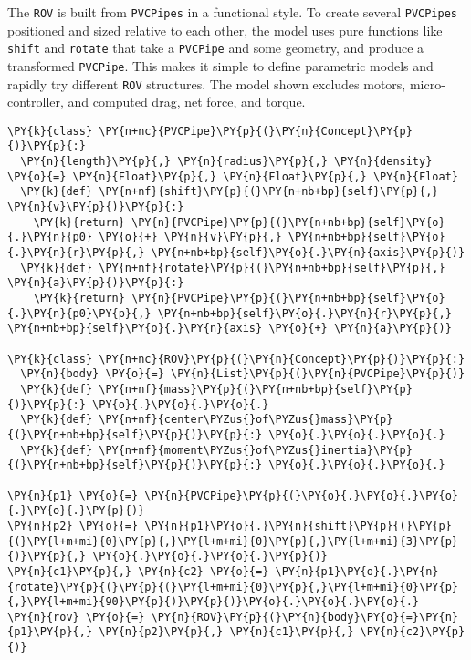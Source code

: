 \documentclass[letterpaper,compsoc,twoside]{IEEEtran}
\makeatletter
\def\PY@reset{\let\PY@it=\relax \let\PY@bf=\relax \let\PY@ul=\relax \let\PY@tc=\relax \let\PY@bc=\relax \let\PY@ff=\relax}
\def\PY@tok#1{\csname PY@tok@#1\endcsname}
\def\PY@toks#1+{\ifx\relax#1\empty\else \PY@tok{#1}\expandafter\PY@toks\fi}
\def\PY@do#1{\PY@bc{\PY@tc{\PY@ul{\PY@it{\PY@bf{\PY@ff{#1}}}}}}}
\def\PY#1#2{\PY@reset\PY@toks#1+\relax+\PY@do{#2}}
\def\PYZus{\char`\_}
\makeatother
\begin{document}
The \texttt{ROV} is built from \texttt{PVCPipes} in a functional style. To create several \texttt{PVCPipes} positioned and sized relative to each other, the model uses pure functions like \texttt{shift} and \texttt{rotate} that take a \texttt{PVCPipe} and some geometry, and produce a transformed \texttt{PVCPipe}. This makes it simple to define parametric models and rapidly try different \texttt{ROV} structures. The model shown excludes motors, micro-controller, and computed drag, net force, and torque.\begin{Verbatim}[commandchars=\\\{\},fontsize=\footnotesize]
\PY{k}{class} \PY{n+nc}{PVCPipe}\PY{p}{(}\PY{n}{Concept}\PY{p}{)}\PY{p}{:}
  \PY{n}{length}\PY{p}{,} \PY{n}{radius}\PY{p}{,} \PY{n}{density} \PY{o}{=} \PY{n}{Float}\PY{p}{,} \PY{n}{Float}\PY{p}{,} \PY{n}{Float}
  \PY{k}{def} \PY{n+nf}{shift}\PY{p}{(}\PY{n+nb+bp}{self}\PY{p}{,} \PY{n}{v}\PY{p}{)}\PY{p}{:}
    \PY{k}{return} \PY{n}{PVCPipe}\PY{p}{(}\PY{n+nb+bp}{self}\PY{o}{.}\PY{n}{p0} \PY{o}{+} \PY{n}{v}\PY{p}{,} \PY{n+nb+bp}{self}\PY{o}{.}\PY{n}{r}\PY{p}{,} \PY{n+nb+bp}{self}\PY{o}{.}\PY{n}{axis}\PY{p}{)}
  \PY{k}{def} \PY{n+nf}{rotate}\PY{p}{(}\PY{n+nb+bp}{self}\PY{p}{,} \PY{n}{a}\PY{p}{)}\PY{p}{:}
    \PY{k}{return} \PY{n}{PVCPipe}\PY{p}{(}\PY{n+nb+bp}{self}\PY{o}{.}\PY{n}{p0}\PY{p}{,} \PY{n+nb+bp}{self}\PY{o}{.}\PY{n}{r}\PY{p}{,} \PY{n+nb+bp}{self}\PY{o}{.}\PY{n}{axis} \PY{o}{+} \PY{n}{a}\PY{p}{)}

\PY{k}{class} \PY{n+nc}{ROV}\PY{p}{(}\PY{n}{Concept}\PY{p}{)}\PY{p}{:}
  \PY{n}{body} \PY{o}{=} \PY{n}{List}\PY{p}{(}\PY{n}{PVCPipe}\PY{p}{)}
  \PY{k}{def} \PY{n+nf}{mass}\PY{p}{(}\PY{n+nb+bp}{self}\PY{p}{)}\PY{p}{:} \PY{o}{.}\PY{o}{.}\PY{o}{.}
  \PY{k}{def} \PY{n+nf}{center\PYZus{}of\PYZus{}mass}\PY{p}{(}\PY{n+nb+bp}{self}\PY{p}{)}\PY{p}{:} \PY{o}{.}\PY{o}{.}\PY{o}{.}
  \PY{k}{def} \PY{n+nf}{moment\PYZus{}of\PYZus{}inertia}\PY{p}{(}\PY{n+nb+bp}{self}\PY{p}{)}\PY{p}{:} \PY{o}{.}\PY{o}{.}\PY{o}{.}

\PY{n}{p1} \PY{o}{=} \PY{n}{PVCPipe}\PY{p}{(}\PY{o}{.}\PY{o}{.}\PY{o}{.}\PY{o}{.}\PY{p}{)}
\PY{n}{p2} \PY{o}{=} \PY{n}{p1}\PY{o}{.}\PY{n}{shift}\PY{p}{(}\PY{p}{(}\PY{l+m+mi}{0}\PY{p}{,}\PY{l+m+mi}{0}\PY{p}{,}\PY{l+m+mi}{3}\PY{p}{)}\PY{p}{,} \PY{o}{.}\PY{o}{.}\PY{o}{.}\PY{p}{)}
\PY{n}{c1}\PY{p}{,} \PY{n}{c2} \PY{o}{=} \PY{n}{p1}\PY{o}{.}\PY{n}{rotate}\PY{p}{(}\PY{p}{(}\PY{l+m+mi}{0}\PY{p}{,}\PY{l+m+mi}{0}\PY{p}{,}\PY{l+m+mi}{90}\PY{p}{)}\PY{p}{)}\PY{o}{.}\PY{o}{.}\PY{o}{.}
\PY{n}{rov} \PY{o}{=} \PY{n}{ROV}\PY{p}{(}\PY{n}{body}\PY{o}{=}\PY{n}{p1}\PY{p}{,} \PY{n}{p2}\PY{p}{,} \PY{n}{c1}\PY{p}{,} \PY{n}{c2}\PY{p}{)}
\end{Verbatim}
\end{document}
